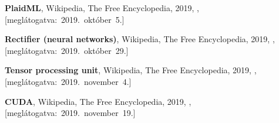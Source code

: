 \begin{thebibliography}{9}
	\textbf{PlaidML},
	{Wikipedia}{,} The Free Encyclopedia,
	2019,
	,
	\mbox{[meglátogatva:~2019.~október~5.]}

	\textbf{Rectifier (neural networks)},
	{Wikipedia}{,} The Free Encyclopedia,
	2019,
	,
	\mbox{[meglátogatva:~2019.~október~29.]}

	\textbf{Tensor processing unit},
	{Wikipedia}{,} The Free Encyclopedia,
	2019,
	,
	\mbox{[meglátogatva:~2019.~november~4.]}

	\textbf{CUDA},
	{Wikipedia}{,} The Free Encyclopedia,
	2019,
	,
	\mbox{[meglátogatva:~2019.~november~19.]}


\end{thebibliography}